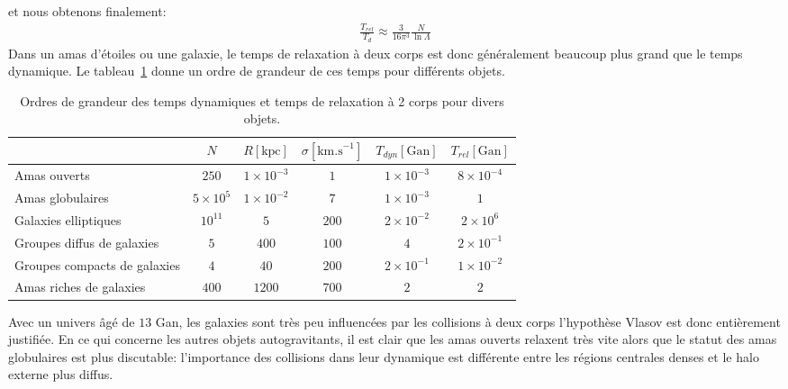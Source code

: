et nous obtenons finalement:
\begin{align*}
	\frac{T_{rel}}{T_{d}}\approx\frac{3}{16\pi^{3}}\frac{N}{\ln \Lambda}%
\end{align*}
Dans un amas d'étoiles ou une galaxie, le temps de relaxation à deux corps est donc généralement beaucoup plus grand que le temps dynamique. Le
tableau~\ref{Tab::TempsCarac::OG} donne un ordre de grandeur de ces temps pour différents objets. %
\begin{table}[htbp]
	\centering \begin{tabular}[c]{l|c|c|c|c|c|}
		\cline{2-6} & $N$ & $R\left[  \text{kpc}\right]  $ & $\sigma\left[  \text{km.s}^{-1}\right]$ & $T_{dyn}\left[  \text{Gan}\right]  $ & $T_{rel}\left[\text{Gan}\right]$\\\hline
		\multicolumn{0}{|l|}{\small {Amas ouverts}} & $250$ & $1\times10^{-3}$ & $1$ & $1\times10^{-3}$ & $8\times10^{-4}$\\\hline
		\multicolumn{0}{|l|}{\small {Amas globulaires}} & $5\times10^{5}$ & $1\times10^{-2}$ & $7$ & $1\times10^{-3}$ & $1$\\\hline
		\multicolumn{0}{|l|}{\small {Galaxies elliptiques}} & $10^{11}$ & $5$ & $200$ & $2\times10^{-2}$ & $2\times10^{6}$\\\hline
		\multicolumn{0}{|l|}{\small {Groupes diffus de galaxies}} & $5$ & $400$ & $100$ & $4$ & $2\times 10^{-1}$\\\hline
		\multicolumn{0}{|l|}{\small {Groupes compacts de galaxies}} & $4$ & $40$ & $200$ & $2\times 10^{-1}$ & $1\times10^{-2}$\\\hline
		\multicolumn{0}{|l|}{\small {Amas riches de galaxies}} & $400$ & $1200$ & $700$ & $2$ & $2$\\\hline
	\end{tabular}
	\caption{Ordres de grandeur des temps dynamiques et temps de relaxation à 2 corps pour divers objets.\label{Tab::TempsCarac::OG}}
\end{table}
Avec un univers âgé de $13$ Gan, les galaxies sont très peu influencées par les collisions à deux corps %
l'hypothèse Vlasov
est donc entièrement justifiée. En ce qui concerne les autres objets autogravitants, il est clair que les amas ouverts relaxent très vite alors que le
statut des amas globulaires est plus discutable: l'importance des collisions dans leur dynamique est différente entre les régions centrales denses et
le halo externe plus diffus.

